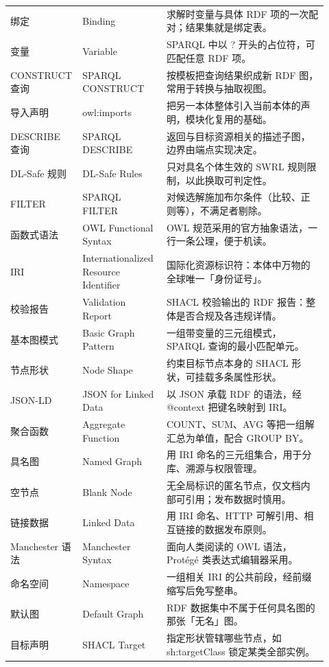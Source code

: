 \begin{longtable}{@{}p{0.16\linewidth}p{0.26\linewidth}p{0.5\linewidth}@{}}
绑定 & Binding & 求解时变量与具体 RDF 项的一次配对；结果集就是绑定表。 \\
变量 & Variable & SPARQL 中以 ? 开头的占位符，可匹配任意 RDF 项。 \\
CONSTRUCT 查询 & SPARQL CONSTRUCT & 按模板把查询结果织成新 RDF 图，常用于转换与抽取视图。 \\
导入声明 & owl:imports & 把另一本体整体引入当前本体的声明，模块化复用的基础。 \\
DESCRIBE 查询 & SPARQL DESCRIBE & 返回与目标资源相关的描述子图，边界由端点实现决定。 \\
DL-Safe 规则 & DL-Safe Rules & 只对具名个体生效的 SWRL 规则限制，以此换取可判定性。 \\
FILTER & SPARQL FILTER & 对候选解施加布尔条件（比较、正则等），不满足者剔除。 \\
函数式语法 & OWL Functional Syntax & OWL 规范采用的官方抽象语法，一行一条公理，便于机读。 \\
IRI & Internationalized Resource Identifier & 国际化资源标识符：本体中万物的全球唯一「身份证号」。 \\
校验报告 & Validation Report & SHACL 校验输出的 RDF 报告：整体是否合规及各违规详情。 \\
基本图模式 & Basic Graph Pattern & 一组带变量的三元组模式，SPARQL 查询的最小匹配单元。 \\
节点形状 & Node Shape & 约束目标节点本身的 SHACL 形状，可挂载多条属性形状。 \\
JSON-LD & JSON for Linked Data & 以 JSON 承载 RDF 的语法，经 @context 把键名映射到 IRI。 \\
聚合函数 & Aggregate Function & COUNT、SUM、AVG 等把一组解汇总为单值，配合 GROUP BY。 \\
具名图 & Named Graph & 用 IRI 命名的三元组集合，用于分库、溯源与权限管理。 \\
空节点 & Blank Node & 无全局标识的匿名节点，仅文档内部可引用；发布数据时慎用。 \\
链接数据 & Linked Data & 用 IRI 命名、HTTP 可解引用、相互链接的数据发布原则。 \\
Manchester 语法 & Manchester Syntax & 面向人类阅读的 OWL 语法，Protégé 类表达式编辑器采用。 \\
命名空间 & Namespace & 一组相关 IRI 的公共前段，经前缀缩写后免写整串。 \\
默认图 & Default Graph & RDF 数据集中不属于任何具名图的那张「无名」图。 \\
目标声明 & SHACL Target & 指定形状管辖哪些节点，如 sh:targetClass 锁定某类全部实例。 \\

\end{longtable}
